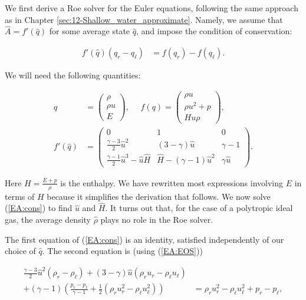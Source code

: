 \documentclass{SIAMbook2016}
\begin{document}
We first derive a Roe solver for the Euler equations, following the same
approach as in Chapter \ref{sec:12-Shallow_water_approximate}. Namely,
we assume that \(\hat{A} = f'(\hat{q})\) for some average state
\(\hat{q}\), and impose the condition of conservation:

\begin{align} \label{EA:cons}
    f'(\hat{q}) (q_r - q_\ell) & = f(q_r) - f(q_\ell).
\end{align}

We will need the following quantities:

\begin{align}
q & = \begin{pmatrix} \rho \\ \rho u \\ E \end{pmatrix}, \ \ \ \ \ \  f(q) = \begin{pmatrix} \rho u \\ \rho u^2 + p \\ H u \rho \end{pmatrix}, \\
f'(\hat{q}) & = \begin{pmatrix} 
                0 & 1 & 0 \\ 
                \frac{\gamma-3}{2}\hat{u}^2 & (3-\gamma)\hat{u} & \gamma-1 \\
                \frac{\gamma-1}{2}\hat{u}^3 - \hat{u}\hat{H} & \hat{H} - (\gamma-1)\hat{u}^2 & \gamma \hat{u} \end{pmatrix}.
\end{align}

Here \(H = \frac{E+p}{\rho}\) is the enthalpy. We have rewritten most
expressions involving \(E\) in terms of \(H\) because it simplifies the
derivation that follows. We now solve (\ref{EA:cons}) to find
\(\hat{u}\) and \(\hat{H}\). It turns out that, for the case of a
polytropic ideal gas, the average density \(\hat{\rho}\) plays no role
in the Roe solver.

The first equation of (\ref{EA:cons}) is an identity, satisfied
independently of our choice of \(\hat{q}\). The second equation is
(using (\ref{EA:EOS}))

\begin{align}
    \frac{\gamma-3}{2}\hat{u}^2 (\rho_r - \rho_\ell) + (3-\gamma)\hat{u}(\rho_r u_r - \rho_\ell u_\ell) \\ + (\gamma-1)\left( \frac{p_r-p_\ell}{\gamma-1} + \frac{1}{2}(\rho_r u_r^2 - \rho_\ell u_\ell^2) \right) & = \rho_r u_r^2 - \rho_\ell u_\ell^2 + p_r - p_\ell,
\end{align}
\end{document}
